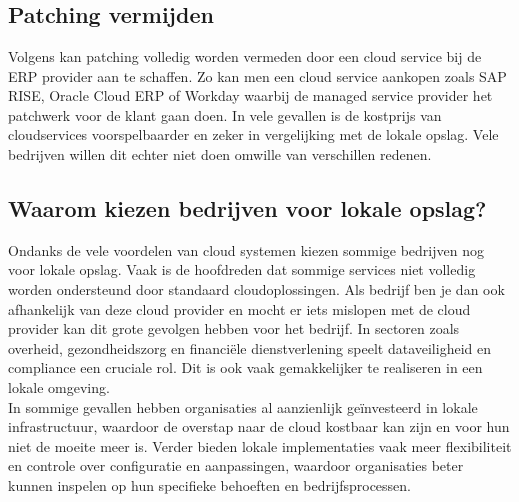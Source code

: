 
\chapter{}
\label{ch:corpus}

\section{Patching vermijden}

Volgens \textcite{Munck2024} kan patching volledig worden vermeden door een cloud service bij de ERP provider aan te schaffen. Zo kan men een cloud service aankopen zoals SAP RISE, Oracle Cloud ERP of Workday waarbij de 
managed service provider het patchwerk voor de klant gaan doen. In vele gevallen is de kostprijs van cloudservices voorspelbaarder en zeker in vergelijking met de lokale opslag. Vele bedrijven
 willen dit echter niet doen omwille van verschillen redenen.\\


\section{Waarom kiezen bedrijven voor lokale opslag?}
Ondanks de vele voordelen van cloud systemen kiezen sommige bedrijven nog voor lokale opslag. Vaak is de hoofdreden dat sommige services niet volledig worden ondersteund door standaard cloudoplossingen. Als bedrijf ben je dan ook afhankelijk van deze cloud provider en mocht er iets mislopen met de cloud provider kan dit grote gevolgen hebben voor het bedrijf.
In sectoren zoals overheid, gezondheidszorg en financiële dienstverlening speelt dataveiligheid en compliance een cruciale rol. Dit is ook vaak gemakkelijker te realiseren in een lokale omgeving.\\ 
In sommige gevallen hebben organisaties al aanzienlijk geïnvesteerd in lokale infrastructuur, waardoor de overstap naar de cloud kostbaar kan zijn en voor hun niet de moeite meer is.
Verder bieden lokale implementaties vaak meer flexibiliteit en controle over configuratie en aanpassingen, waardoor organisaties beter kunnen inspelen op hun specifieke behoeften en 
bedrijfsprocessen.\\



